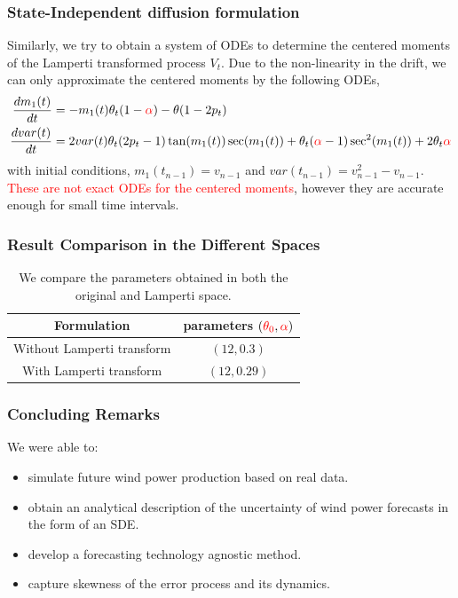 \documentclass[aspectratio=169]{beamer}\usepackage[utf8]{inputenc}
\begin{document}
\begin{frame}\frametitle{State-Independent diffusion formulation}
Similarly, we try to obtain a system of ODEs to determine the centered moments of the Lamperti transformed process $V_t$. Due to the non-linearity in the drift, we can only approximate the centered moments by the following ODEs,
\begin{equation}
\begin{split}
\frac{d m_1 (t)}{dt} &= - m_1(t)\theta_t (1-\textcolor{red}{\alpha}) - \theta (1-2 p_t) \\
\frac{d var(t)}{dt} &=  2 var(t) \theta_t (2p_t - 1 ) \tan(m_1 (t)) \sec(m_1 (t)) + \theta_t (\textcolor{red}{\alpha} - 1) \sec^2(m_1 (t))  + 2 \theta_t \textcolor{red}{\alpha}\\
\end{split}
\end{equation}
with initial conditions, $m_1(t_{n-1})= v_{n-1}$ and $var(t_{n-1})= v_{n-1}^2 - v_{n-1}$.\\
\bigskip 
\textcolor{red}{These are not exact ODEs for the centered moments}, however they are accurate enough for small time intervals. 
\end{frame}



\begin{frame}\frametitle{Result Comparison in the Different Spaces}
\begin{table}[]
\centering
\begin{tabular}{|c|c|}
\hline
Formulation   &  parameters $(\textcolor{red}{\theta_0}, \textcolor{red}{\alpha})$    \\ \hline
Without Lamperti transform &   $(12,0.3) $   \\ \hline
With Lamperti transform &   $(12,0.29)  $   \\ \hline
\end{tabular}
\caption{We compare the parameters obtained in both the original and Lamperti space. }
\label{tab:model_comparison}
\end{table}
\end{frame}

\begin{frame}\frametitle{Concluding Remarks}
We were able to:
\begin{itemize}
  \item simulate future wind power production based on real data.
  \item obtain an analytical description of the uncertainty of wind power forecasts in the form of an SDE.
  \item develop a forecasting technology agnostic method.
  \item capture skewness of the error process and its dynamics.
\end{itemize}
\end{frame}
\end{document}
